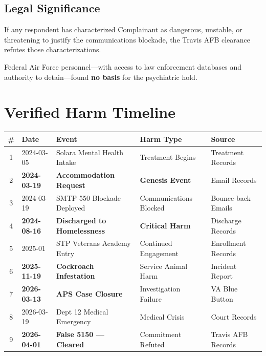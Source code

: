 \documentclass[12pt,letterpaper]{article}
\begin{document}
\subsection{Legal Significance}

If any respondent has characterized Complainant as dangerous, unstable, or threatening to justify the communications blockade, the Travis AFB clearance refutes those characterizations.

Federal Air Force personnel---with access to law enforcement databases and authority to detain---found \textbf{no basis} for the psychiatric hold.

\newpage

\section{Verified Harm Timeline}

\begin{center}
\begin{longtable}{cllll}
\toprule
\textbf{\#} & \textbf{Date} & \textbf{Event} & \textbf{Harm Type} & \textbf{Source} \\
\midrule
\endhead
1 & 2024-03-05 & Solara Mental Health Intake & Treatment Begins & Treatment Records \\
2 & \textbf{2024-03-19} & \textbf{Accommodation Request} & \textbf{Genesis Event} & Email Records \\
3 & 2024-03-19 & SMTP 550 Blockade Deployed & Communications Blocked & Bounce-back Emails \\
4 & \textbf{2024-08-16} & \textbf{Discharged to Homelessness} & \textbf{Critical Harm} & Discharge Records \\
5 & 2025-01 & STP Veterans Academy Entry & Continued Engagement & Enrollment Records \\
6 & \textbf{2025-11-19} & \textbf{Cockroach Infestation} & Service Animal Harm & Incident Report \\
7 & \textbf{2026-03-13} & \textbf{APS Case Closure} & Investigation Failure & VA Blue Button \\
8 & 2026-03-19 & Dept 12 Medical Emergency & Medical Crisis & Court Records \\
9 & \textbf{2026-04-01} & \textbf{False 5150 --- Cleared} & Commitment Refuted & Travis AFB Records \\
\bottomrule
\end{longtable}
\end{center}
\end{document}
